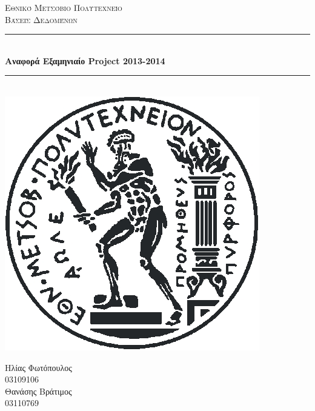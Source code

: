 \documentclass[a4paper,12pt]{article}
\begin{document}
\begin{titlepage}

\newcommand{\HRule}{\rule{\linewidth}{0.5mm}} 

\center
 

\textsc{\LARGE Εθνικό Μετσόβιο Πολυτεχνείο}\\[1.5cm] %
\textsc{\Large Βάσεις Δεδομένων}\\[0.5cm] %



\HRule \\[0.4cm]
{ \huge \bfseries Αναφορά Εξαμηνιαίο Project 2013-2014  }\\[0.4cm]
\HRule \\[1.5cm]
 

\includegraphics[scale=0.5]{ntua_logo} 
 
\vfill

Ηλίας Φωτόπουλος \\ 03109106\\
Θανάσης Βράτιμος \\03110769



\end{titlepage}
\end{document}
